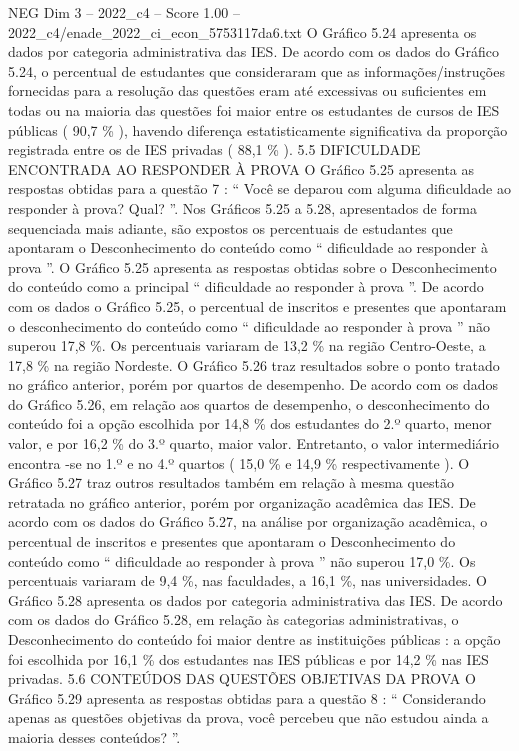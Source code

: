 \begin{textsample}{NEG Dim 3 – 2022\_c4 – Score 1.00 – 2022\_c4/enade\_2022\_ci\_econ\_5753117da6.txt}
O Gráfico 5.24 apresenta os dados por categoria administrativa das IES.
De acordo com os dados do Gráfico 5.24, o percentual de estudantes que consideraram que as informações/instruções fornecidas para a resolução das questões eram até excessivas ou suficientes em todas ou na maioria das questões foi maior entre os estudantes de cursos de IES públicas ( 90,7 \% ), havendo diferença estatisticamente significativa da proporção registrada entre os de IES privadas ( 88,1 \% ). 5.5 DIFICULDADE ENCONTRADA AO RESPONDER À PROVA O Gráfico 5.25 apresenta as respostas obtidas para a questão 7 : “ Você se deparou com alguma dificuldade ao responder à prova?
Qual? ”.
Nos Gráficos 5.25 a 5.28, apresentados de forma sequenciada mais adiante, são expostos os percentuais de estudantes que apontaram o Desconhecimento do conteúdo como “ dificuldade ao responder à prova ”.
O Gráfico 5.25 apresenta as respostas obtidas sobre o Desconhecimento do conteúdo como a principal “ dificuldade ao responder à prova ”.
De acordo com os dados o Gráfico 5.25, o percentual de inscritos e presentes que apontaram o desconhecimento do conteúdo como “ dificuldade ao responder à prova ” não superou 17,8 \%.
Os percentuais variaram de 13,2 \% na região Centro-Oeste, a 17,8 \% na região Nordeste.
O Gráfico 5.26 traz resultados sobre o ponto tratado no gráfico anterior, porém por quartos de desempenho.
De acordo com os dados do Gráfico 5.26, em relação aos quartos de desempenho, o desconhecimento do conteúdo foi a opção escolhida por 14,8 \% dos estudantes do 2.º quarto, menor valor, e por 16,2 \% do 3.º quarto, maior valor.
Entretanto, o valor intermediário encontra -se no 1.º e no 4.º quartos ( 15,0 \% e 14,9 \% respectivamente ).
O Gráfico 5.27 traz outros resultados também em relação à mesma questão retratada no gráfico anterior, porém por organização acadêmica das IES.
De acordo com os dados do Gráfico 5.27, na análise por organização acadêmica, o percentual de inscritos e presentes que apontaram o Desconhecimento do conteúdo como “ dificuldade ao responder à prova ” não superou 17,0 \%.
Os percentuais variaram de 9,4 \%, nas faculdades, a 16,1 \%, nas universidades.
O Gráfico 5.28 apresenta os dados por categoria administrativa das IES.
De acordo com os dados do Gráfico 5.28, em relação às categorias administrativas, o Desconhecimento do conteúdo foi maior dentre as instituições públicas : a opção foi escolhida por 16,1 \% dos estudantes nas IES públicas e por 14,2 \% nas IES privadas. 5.6 CONTEÚDOS DAS QUESTÕES OBJETIVAS DA PROVA O Gráfico 5.29 apresenta as respostas obtidas para a questão 8 : “ Considerando apenas as questões objetivas da prova, você percebeu que não estudou ainda a maioria desses conteúdos? ”.

\end{textsample}
